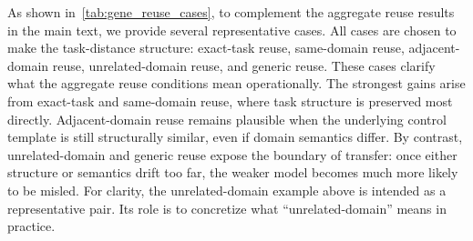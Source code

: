 \documentclass{article}
\begin{document}
As shown in~\cref{tab:gene_reuse_cases}, to complement the aggregate reuse results in the main text, we provide several representative cases.
All cases are chosen to make the task-distance structure: exact-task reuse, same-domain reuse, adjacent-domain reuse, unrelated-domain reuse, and generic reuse.
These cases clarify what the aggregate reuse conditions mean operationally.
The strongest gains arise from exact-task and same-domain reuse, where task structure is preserved most directly.
Adjacent-domain reuse remains plausible when the underlying control template is still structurally similar, even if domain semantics differ.
By contrast, unrelated-domain and generic reuse expose the boundary of transfer: once either structure or semantics drift too far, the weaker model becomes much more likely to be misled.
For clarity, the unrelated-domain example above is intended as a representative pair.
Its role is to concretize what ``unrelated-domain'' means in practice.
\end{document}
